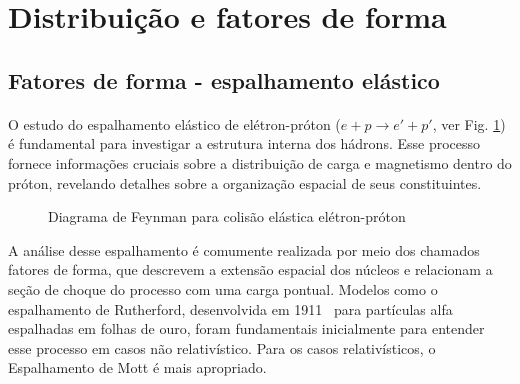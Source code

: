 \section{Distribuição e fatores de forma}
\subsection{Fatores de forma - espalhamento elástico}
\paragraph{}
O estudo do espalhamento elástico de elétron-próton ($e + p \rightarrow e' + p'$, ver  Fig. \ref{fig:elast-ep}) é fundamental para investigar a estrutura interna dos hádrons. Esse processo fornece informações cruciais sobre a distribuição de carga e magnetismo dentro do próton, revelando detalhes sobre a organização espacial de seus constituintes.
\begin{figure}[!ht]
    \centering
    \caption{Diagrama de Feynman para colisão elástica elétron-próton}
    \label{fig:elast-ep}
\end{figure}

A análise desse espalhamento é comumente realizada por meio dos chamados fatores de forma, que descrevem a extensão espacial dos núcleos e relacionam a seção de choque do processo com uma carga pontual. Modelos como  o espalhamento de Rutherford, desenvolvida em 1911~\cite{rutherford} para partículas alfa espalhadas em folhas de ouro, foram fundamentais inicialmente para entender esse processo em casos não relativístico. Para os casos relativísticos, o Espalhamento de Mott  é mais apropriado.

